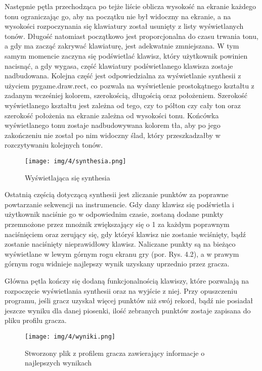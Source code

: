 Następnie pętla przechodząca po tejże liście oblicza wysokość na ekranie każdego tonu ograniczając go, aby na początku nie był widoczny na ekranie, a na wysokości rozpoczynania się klawiatury został usunięty z listy wyświetlanych tonów. Długość natomiast początkowo jest proporcjonalna do czasu trwania tonu, a gdy ma zacząć zakrywać klawiaturę, jest adekwatnie zmniejszana. W tym samym momencie zaczyna się podświetlać klawisz, który użytkownik powinien nacisnąć, a gdy wygasa, część klawiatury podświetlanego klawisza zostaje nadbudowana. Kolejna część jest odpowiedzialna za wyświetlanie synthesii z użyciem pygame.draw.rect, co pozwala na wyświetlenie prostokątnego kształtu z zadanym wcześniej kolorem, szerokością, długością oraz położeniem. Szerokość wyświetlanego kształtu jest zależna od tego, czy to półton czy cały ton oraz szerokość położenia na ekranie zależna od wysokości tonu. Końcówka wyświetlanego tonu zostaje nadbudowywana kolorem tła, aby po jego zakończeniu nie został po nim widoczny ślad, który przeszkadzałby w rozczytywaniu kolejnych tonów.

\begin{figure}[h]
  \centering
  \texttt{[image: img/4/synthesia.png]}
  \caption{Wyświetlająca się synthesia}
\end{figure}

Ostatnią częścią dotyczącą synthesii jest zliczanie punktów za poprawne powtarzanie sekwencji na instrumencie. Gdy dany klawisz się podświetla i użytkownik naciśnie go w odpowiednim czasie, zostaną dodane punkty przemnożone przez mnożnik zwiększający się o 1 za każdym poprawnym naciśnięciem oraz zerujący się, gdy któryś klawisz nie zostanie wciśnięty, bądź zostanie naciśnięty nieprawidłowy klawisz. Naliczane punkty są na bieżąco wyświetlane w lewym górnym rogu ekranu gry  (por. Rys. 4.2), a w prawym górnym rogu widnieje najlepszy wynik uzyskany uprzednio przez gracza.

Główna pętla kończy się dodaną funkcjonalnością klawiszy, które pozwalają na rozpoczęcie wyświetlania synthesii oraz na wyjście z niej. Przy opuszczeniu programu, jeśli gracz uzyskał więcej punktów niż swój rekord, bądź nie posiadał jeszcze wyniku dla danej piosenki, ilość zebranych punktów zostaje zapisana do pliku profilu gracza.

\begin{figure}[h]
  \centering
  \texttt{[image: img/4/wyniki.png]}
  \caption{Stworzony plik z profilem gracza zawierający informacje o najlepszych wynikach}
\end{figure}

